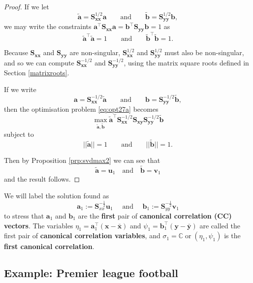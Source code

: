 \documentclass[
]{book}
\theoremstyle{definition}
\theoremstyle{definition}
\theoremstyle{definition}
\theoremstyle{definition}
\theoremstyle{remark}
\begin{document}
\begin{proof}
If we let
\[
\tilde{\mathbf a}=\mathbf S_{\mathbf x\mathbf x}^{1/2} \mathbf a\qquad \text{and} \qquad \tilde{\mathbf b}=\mathbf S_{\mathbf y\mathbf y}^{1/2}\mathbf b,
\]
we may write the constraints \(\mathbf a^\top \mathbf S_{\mathbf x\mathbf x}\mathbf a=\mathbf b^\top \mathbf S_{\mathbf y\mathbf y}\mathbf b=1\) as
\[
\tilde{\mathbf a}^\top \tilde{\mathbf a}=1 \qquad \text{and} \qquad \tilde{\mathbf b}^\top \tilde{\mathbf b}=1.
\]

Because \(\mathbf S_{\mathbf x\mathbf x}\) and \(\mathbf S_{\mathbf y\mathbf y}\) are non-singular, \(\mathbf S_{\mathbf x\mathbf x}^{1/2}\) and \(\mathbf S_{\mathbf y\mathbf y}^{1/2}\) must also be non-singular, and so we can compute
\(\mathbf S_{\mathbf x\mathbf x}^{-1/2}\) and \(\mathbf S_{\mathbf y\mathbf y}^{-1/2}\), using the matrix square roots defined in Section \ref{matrixroots}.

If we write
\[
\mathbf a=\mathbf S_{\mathbf x\mathbf x}^{-1/2}\tilde{\mathbf a} \qquad \text{and} \qquad \mathbf b=\mathbf S_{\mathbf y\mathbf y}^{-1/2} \tilde{\mathbf b},
\]
then the optimisation problem \eqref{eq:opt27a} becomes
\[
\max_{\tilde{\mathbf a}, \tilde{\mathbf b}}
\tilde{\mathbf a}^\top \mathbf S_{\mathbf x\mathbf x}^{-1/2}\mathbf S_{\mathbf x\mathbf y}\mathbf S_{\mathbf y\mathbf y}^{-1/2} \tilde{\mathbf b}
\]
subject to
\[
\vert \vert \tilde{\mathbf a} \vert \vert =1 \qquad \text{and} \qquad \vert \vert \tilde{\mathbf b}\vert \vert=1.
\]

Then by Proposition \ref{prp:svdmax2} we can see that
\[\tilde{\mathbf a} = \mathbf u_1 \quad \mbox{and}\quad\tilde{\mathbf b} = \mathbf v_1\]
and the result follows.
\end{proof}

We will label the solution found as
\[\mathbf a_1 := \mathbf S_{xx}^{-\frac{1}{2}}\mathbf u_1\quad \mbox{ and }\quad\mathbf b_1 := \mathbf S_{yy}^{-\frac{1}{2}}\mathbf v_1\]
to stress that \(\mathbf a_1\) and \(\mathbf b_1\) are the \textbf{first} pair of \textbf{canonical correlation (CC) vectors}. The variables \(\eta_1=\mathbf a_1^\top (\mathbf x-\bar{\mathbf x})\) and \(\psi_1=\mathbf b_1^\top (\mathbf y-\bar{\mathbf y})\) are called the first pair of \textbf{canonical correlation variables}, and \(\sigma_1={\mathbb{C}\operatorname{or}}(\eta_1, \psi_1)\) is the \textbf{first canonical correlation}.

\subsection{Example: Premier league football}\label{premcca}
\end{document}
